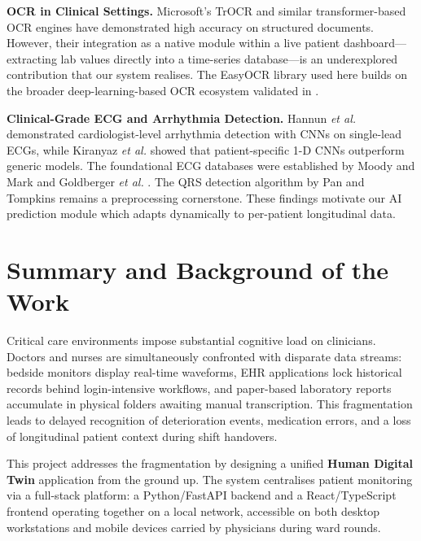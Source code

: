 \documentclass[12pt,a4paper]{article}
\begin{document}
\textbf{OCR in Clinical Settings.}  Microsoft's TrOCR \cite{trocr2021} and similar transformer-based OCR engines have demonstrated high accuracy on structured documents. However, their integration as a native module within a live patient dashboard—extracting lab values directly into a time-series database—is an underexplored contribution that our system realises. The EasyOCR library used here builds on the broader deep-learning-based OCR ecosystem validated in \cite{trocr2021}.

\textbf{Clinical-Grade ECG and Arrhythmia Detection.}  Hannun \textit{et al.} \cite{hannun2019} demonstrated cardiologist-level arrhythmia detection with CNNs on single-lead ECGs, while Kiranyaz \textit{et al.} \cite{kiranyaz2016} showed that patient-specific 1-D CNNs outperform generic models. The foundational ECG databases were established by Moody and Mark \cite{moody1999} and Goldberger \textit{et al.} \cite{goldberger2000}. The QRS detection algorithm by Pan and Tompkins \cite{pan1985} remains a preprocessing cornerstone. These findings motivate our AI prediction module which adapts dynamically to per-patient longitudinal data.

\section{Summary and Background of the Work}

Critical care environments impose substantial cognitive load on clinicians. Doctors
and nurses are simultaneously confronted with disparate data streams: bedside monitors
display real-time waveforms, EHR applications lock historical records behind
login-intensive workflows, and paper-based laboratory reports accumulate in physical
folders awaiting manual transcription. This fragmentation leads to delayed recognition
of deterioration events, medication errors, and a loss of longitudinal patient context
during shift handovers.

This project addresses the fragmentation by designing a unified \textbf{Human Digital
Twin} application from the ground up. The system centralises patient monitoring via a
full-stack platform: a Python/FastAPI backend and a React/TypeScript frontend operating
together on a local network, accessible on both desktop workstations and mobile devices
carried by physicians during ward rounds.
\end{document}
